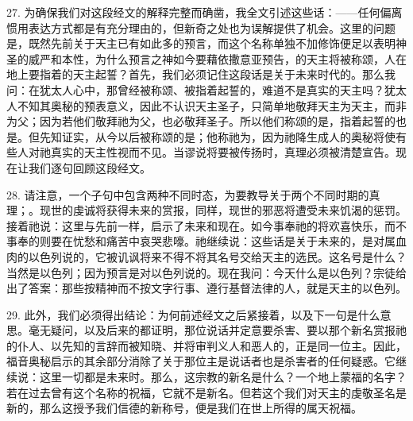 27. 为确保我们对这段经文的解释完整而确凿，我全文引述这些话：——任何偏离惯用表达方式都是有充分理由的，但新奇之处也为误解提供了机会。这里的问题是，既然先前关于天主已有如此多的预言，而这个名称单独不加修饰便足以表明神圣的威严和本性，为什么预言之神如今要藉依撒意亚预告，的天主将被称颂，人在地上要指着的天主起誓？首先，我们必须记住这段话是关于未来时代的。那么我问：在犹太人心中，那曾经被称颂、被指着起誓的，难道不是真实的天主吗？犹太人不知其奥秘的预表意义，因此不认识天主圣子，只简单地敬拜天主为天主，而非为父；因为若他们敬拜祂为父，也必敬拜圣子。所以他们称颂的是，指着起誓的也是。但先知证实，从今以后被称颂的是；他称祂为，因为祂降生成人的奥秘将使有些人对祂真实的天主性视而不见。当谬说将要被传扬时，真理必须被清楚宣告。现在让我们逐句回顾这段经文。\par

28. 请注意，一个子句中包含两种不同时态，为要教导关于两个不同时期的真理；。现世的虔诚将获得未来的赏报，同样，现世的邪恶将遭受未来饥渴的惩罚。接着祂说：这里与先前一样，启示了未来和现在。如今事奉祂的将欢喜快乐，而不事奉的则要在忧愁和痛苦中哀哭悲嚎。祂继续说：这些话是关于未来的，是对属血肉的以色列说的，它被讥讽将来不得不将其名号交给天主的选民。这名号是什么？当然是以色列；因为预言是对以色列说的。现在我问：今天什么是以色列？宗徒给出了答案：那些按精神而不按文字行事、遵行基督法律的人，就是天主的以色列。\par

29. 此外，我们必须得出结论：为何前述经文之后紧接着，以及下一句是什么意思。毫无疑问，以及后来的都证明，那位说话并定意要杀害、要以那个新名赏报祂的仆人、以先知的言辞而被知晓、并将审判义人和恶人的，正是同一位主。因此，福音奥秘启示的其余部分消除了关于那位主是说话者也是杀害者的任何疑惑。它继续说：这里一切都是未来时。那么，这宗教的新名是什么？一个地上蒙福的名字？若在过去曾有这个名称的祝福，它就不是新名。但若这个我们对天主的虔敬圣名是新的，那么这授予我们信德的新称号，便是我们在世上所得的属天祝福。\par

